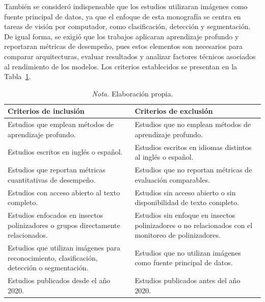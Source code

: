 También se consideró indispensable que los estudios utilizaran imágenes como fuente principal de datos, ya que el enfoque de esta monografía se centra en tareas de visión por computador, como clasificación, detección y segmentación. De igual forma, se exigió que los trabajos aplicaran aprendizaje profundo y reportaran métricas de desempeño, pues estos elementos son necesarios para comparar arquitecturas, evaluar resultados y analizar factores técnicos asociados al rendimiento de los modelos. Los criterios establecidos se presentan en la Tabla~\ref{tab:criterios-inclusion-exclusion}. \\

\begin{table}[H]
    \centering
    \caption{Criterios de inclusión y exclusión}
    \small
    \label{tab:criterios-inclusion-exclusion}
    \begin{tabular}{p{6.2cm} p{6.2cm}}
        \hline
        \textbf{Criterios de inclusión} & \textbf{Criterios de exclusión} \\
        \hline
        
        Estudios que emplean métodos de aprendizaje profundo. 
        & Estudios que no emplean métodos de aprendizaje profundo. \\
        
        Estudios escritos en inglés o español. 
        & Estudios escritos en idiomas distintos al inglés o español. \\
        
        Estudios que reportan métricas cuantitativas de desempeño. 
        & Estudios que no reportan métricas de evaluación comparables. \\
        
        Estudios con acceso abierto al texto completo. 
        & Estudios sin acceso abierto o sin disponibilidad de texto completo. \\
        
        Estudios enfocados en insectos polinizadores o grupos directamente relacionados. 
        & Estudios sin enfoque en insectos polinizadores o no relacionados con el monitoreo de polinizadores. \\
        
        Estudios que utilizan imágenes para reconocimiento, clasificación, detección o segmentación. 
        & Estudios que no utilizan imágenes como fuente principal de datos. \\
        
        Estudios publicados desde el año 2020. 
        & Estudios publicados antes del año 2020. \\
        
        \hline
    \end{tabular}

    \caption*{\normalfont\normalsize\textit{Nota.} Elaboración propia.}
\end{table}

